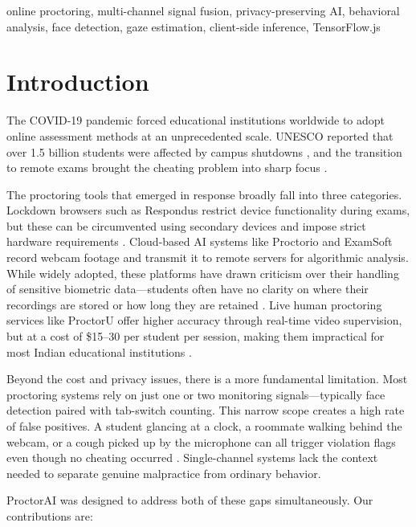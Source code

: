 \documentclass[conference]{IEEEtran}
\begin{document}
\begin{IEEEkeywords}
online proctoring, multi-channel signal fusion, privacy-preserving AI, behavioral analysis, face detection, gaze estimation, client-side inference, TensorFlow.js
\end{IEEEkeywords}

\section{Introduction}

The COVID-19 pandemic forced educational institutions worldwide to adopt online assessment methods at an unprecedented scale. UNESCO reported that over 1.5 billion students were affected by campus shutdowns \cite{unesco2020}, and the transition to remote exams brought the cheating problem into sharp focus \cite{hussein2020}.

The proctoring tools that emerged in response broadly fall into three categories. Lockdown browsers such as Respondus restrict device functionality during exams, but these can be circumvented using secondary devices and impose strict hardware requirements \cite{coghlan2021}. Cloud-based AI systems like Proctorio and ExamSoft record webcam footage and transmit it to remote servers for algorithmic analysis. While widely adopted, these platforms have drawn criticism over their handling of sensitive biometric data---students often have no clarity on where their recordings are stored or how long they are retained \cite{swauger2020}. Live human proctoring services like ProctorU offer higher accuracy through real-time video supervision, but at a cost of \$15--30 per student per session, making them impractical for most Indian educational institutions \cite{nigam2021}.

Beyond the cost and privacy issues, there is a more fundamental limitation. Most proctoring systems rely on just one or two monitoring signals---typically face detection paired with tab-switch counting. This narrow scope creates a high rate of false positives. A student glancing at a clock, a roommate walking behind the webcam, or a cough picked up by the microphone can all trigger violation flags even though no cheating occurred \cite{li2021}. Single-channel systems lack the context needed to separate genuine malpractice from ordinary behavior.

ProctorAI was designed to address both of these gaps simultaneously. Our contributions are:
\end{document}

